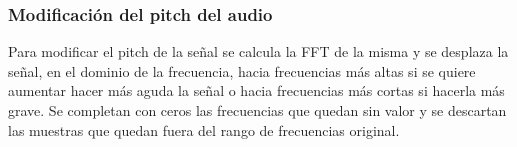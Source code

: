 \documentclass{article}
\begin{document}
\subsubsection*{Modificación del pitch del audio}

Para modificar el pitch de la señal se calcula la FFT de la misma y se desplaza la señal, en el dominio de la frecuencia, hacia frecuencias más altas si se quiere aumentar hacer más aguda la señal o hacia frecuencias más cortas si hacerla más grave. Se completan con ceros las frecuencias que quedan sin valor y se descartan las muestras que quedan fuera del rango de frecuencias original.


\printbibliography
\end{document}
